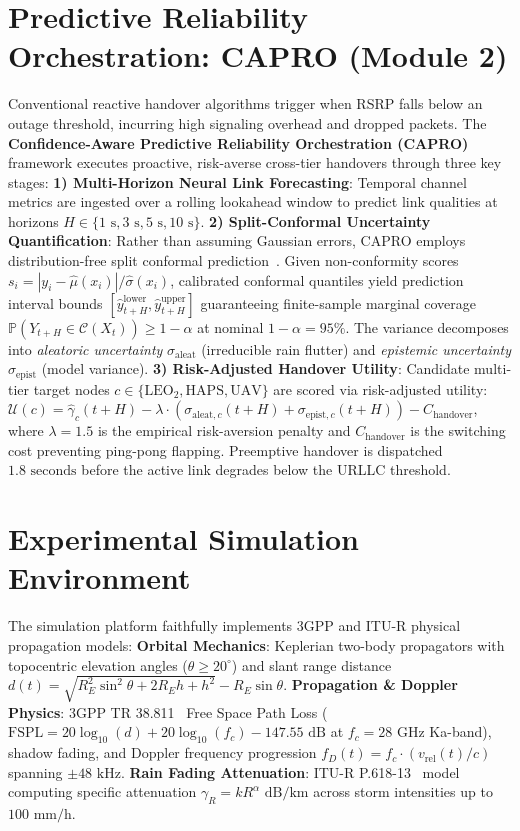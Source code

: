 \documentclass[9pt,a4paper]{article}
\begin{document}
\section{Predictive Reliability Orchestration: CAPRO (Module 2)}
\label{sec:capro}
Conventional reactive handover algorithms trigger when RSRP falls below an outage threshold, incurring high signaling overhead and dropped packets. The \textbf{Confidence-Aware Predictive Reliability Orchestration (CAPRO)} framework executes proactive, risk-averse cross-tier handovers through three key stages:
\textbf{1) Multi-Horizon Neural Link Forecasting}: Temporal channel metrics are ingested over a rolling lookahead window to predict link qualities at horizons $H \in \{1\text{ s}, 3\text{ s}, 5\text{ s}, 10\text{ s}\}$.
\textbf{2) Split-Conformal Uncertainty Quantification}: Rather than assuming Gaussian errors, CAPRO employs distribution-free split conformal prediction~\cite{angelopoulos2021conformal}. Given non-conformity scores $s_i = |y_i - \hat{\mu}(x_i)| / \hat{\sigma}(x_i)$, calibrated conformal quantiles yield prediction interval bounds $[\hat{y}_{t+H}^{\text{lower}}, \hat{y}_{t+H}^{\text{upper}}]$ guaranteeing finite-sample marginal coverage $\mathbb{P}(Y_{t+H} \in \mathcal{C}(X_t)) \ge 1 - \alpha$ at nominal $1 - \alpha = 95\%$. The variance decomposes into \textit{aleatoric uncertainty} $\sigma_{\text{aleat}}$ (irreducible rain flutter) and \textit{epistemic uncertainty} $\sigma_{\text{epist}}$ (model variance).
\textbf{3) Risk-Adjusted Handover Utility}: Candidate multi-tier target nodes $c \in \{\text{LEO}_2, \text{HAPS}, \text{UAV}\}$ are scored via risk-adjusted utility: $\mathcal{U}(c) = \hat{\gamma}_c(t+H) - \lambda \cdot (\sigma_{\text{aleat}, c}(t+H) + \sigma_{\text{epist}, c}(t+H)) - C_{\text{handover}}$, where $\lambda = 1.5$ is the empirical risk-aversion penalty and $C_{\text{handover}}$ is the switching cost preventing ping-pong flapping. Preemptive handover is dispatched $1.8\text{ seconds}$ before the active link degrades below the URLLC threshold.

\clearpage %

\section{Experimental Simulation Environment}
The simulation platform faithfully implements 3GPP and ITU-R physical propagation models:
\textbf{Orbital Mechanics}: Keplerian two-body propagators with topocentric elevation angles ($\theta \ge 20^\circ$) and slant range distance $d(t) = \sqrt{R_E^2 \sin^2\theta + 2 R_E h + h^2} - R_E \sin\theta$.
\textbf{Propagation \& Doppler Physics}: 3GPP TR 38.811~\cite{3gpp_tr38811} Free Space Path Loss ($\text{FSPL} = 20\log_{10}(d) + 20\log_{10}(f_c) - 147.55\text{ dB}$ at $f_c = 28\text{ GHz}$ Ka-band), shadow fading, and Doppler frequency progression $f_D(t) = f_c \cdot (v_{\text{rel}}(t) / c)$ spanning $\pm 48\text{ kHz}$.
\textbf{Rain Fading Attenuation}: ITU-R P.618-13~\cite{itur_p618} model computing specific attenuation $\gamma_R = k R^\alpha\text{ dB/km}$ across storm intensities up to $100\text{ mm/h}$.
\end{document}
